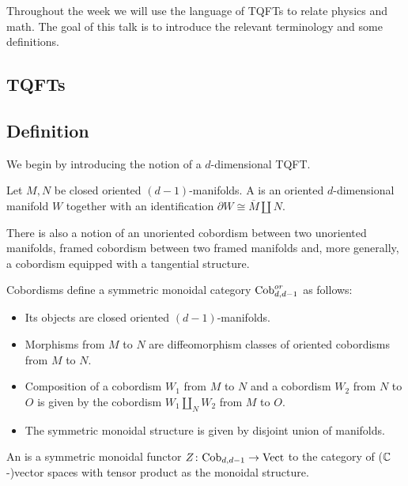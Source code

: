 
Throughout the week we will use the language of TQFTs to relate physics and math. The goal of this talk is to introduce the relevant terminology and some definitions.

\subsection{TQFTs}

\subsection{Definition}

We begin by introducing the notion of a $d$-dimensional TQFT.

\begin{defn}
	Let $M,N$ be closed oriented $(d-1)$-manifolds. A  is an oriented $d$-dimensional manifold $W$ together with an identification $\partial W\cong \overline{M}\coprod N$.
\end{defn}

\begin{remark}
	There is also a notion of an unoriented cobordism between two unoriented manifolds, framed cobordism between two framed manifolds and, more generally, a cobordism equipped with a tangential structure.
\end{remark}

Cobordisms define a symmetric monoidal category $\mathrm{Cob}^{or}_{d, d-1}$ as follows:
\begin{itemize}
	\item Its objects are closed oriented $(d-1)$-manifolds.
	\item Morphisms from $M$ to $N$ are diffeomorphism classes of oriented cobordisms from $M$ to $N$.
	\item Composition of a cobordism $W_1$ from $M$ to $N$ and a cobordism $W_2$ from $N$ to $O$ is given by the cobordism $W_1\coprod_N W_2$ from $M$ to $O$.
	\item The symmetric monoidal structure is given by disjoint union of manifolds.
\end{itemize}

\begin{defn}
	An  is a symmetric monoidal functor $Z\colon \mathrm{Cob}_{d, d-1}\rightarrow \mathrm{Vect}$ to the category of ($\mathbb{C}$-)vector spaces with tensor product as the monoidal structure.
\end{defn}

